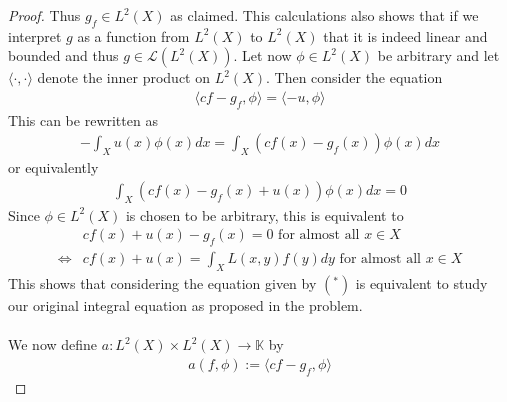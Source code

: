 \documentclass[12pt,a4paper]{article}
\begin{document}
\begin{proof}
Thus $g_f \in L^2(X)$ as claimed. This calculations also shows that if we interpret $g$ as a function from $L^2(X)$ to $L^2(X)$ that it is indeed linear and bounded and thus $g \in \mathcal{L}(L^2(X))$.
\newpage
Let now $\phi \in L^2(X)$ be arbitrary and let $\langle \cdot ,  \cdot \rangle$ denote the inner product on $L^2(X)$. Then consider the equation 
\begin{align*}
\langle cf -g_f, \phi \rangle = \langle -u , \phi \rangle  \tag{*}
\end{align*}
This can be rewritten as
\begin{align*}
- \int_X u(x) \phi (x) dx  =  \int_X \left( cf(x) -g_f(x)\right) \phi(x) dx 
\end{align*}
or equivalently
\begin{align*}
 \int_X (cf(x)-g_f(x) + u(x)) \phi(x) dx = 0 
\end{align*}
Since $\phi \in L^2(X)$ is chosen to be arbitrary, this is equivalent to 
\begin{align*}
&cf(x) +u(x) - g_f(x) = 0 \text{ for almost all } x \in X \\ \iff & cf(x)+u(x) = \int_X L(x,y)f(y)dy \text{ for almost all } x \in X 
\end{align*}
This shows that considering the equation given by $(^*)$ is equivalent to study our original integral equation as proposed in the problem. \\
\\
We now define $a: L^2(X) \times L^2(X) \to \mathbb{K}$ by 
\begin{align*}
a(f, \phi) := \langle cf - g_f, \phi \rangle 
\end{align*}
\end{proof}
\newpage
\end{document}
